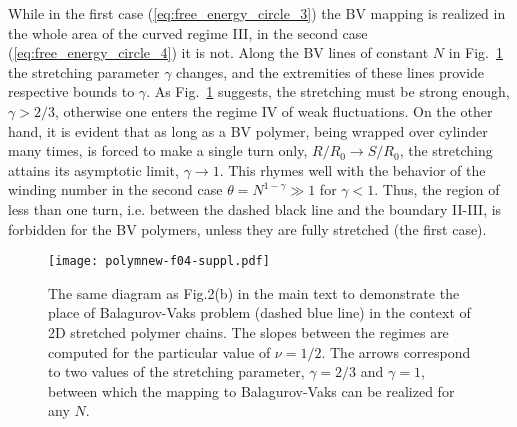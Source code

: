 \documentclass[aps,pre,floatfix,twocolumn,nofootinbib]{revtex4-2}
\newcommand{\eq}[1]{(\ref{#1})}
\newcommand{\fig}[1]{Fig.~\ref{#1}}
\begin{document}
While in the first case \eq{eq:free_energy_circle_3} the BV mapping is realized in the whole area of the curved regime III, in the second case \eq{eq:free_energy_circle_4} it is not. Along the BV lines of constant $N$ in \fig{fig:diagram_bv} the stretching parameter $\gamma$ changes, and the extremities of these lines provide respective bounds to $\gamma$. As \fig{fig:diagram_bv} suggests, the stretching must be strong enough, $\gamma > 2/3$, otherwise one enters the regime IV of weak fluctuations. On the other hand, it is evident that as long as a BV polymer, being wrapped over cylinder many times, is forced to make a single turn only, $R/R_0 \to S/R_0$, the stretching attains its asymptotic limit, $\gamma \to 1$. This rhymes well with the behavior of the winding number in the second case $\theta = N^{1-\gamma} \gg 1$ for $\gamma<1$. Thus, the region of less than one turn, i.e. between the dashed black line and the boundary II-III, is forbidden for the BV polymers, unless they are fully stretched (the first case).


\begin{figure}[ht]
  \centering
  \texttt{[image: polymnew-f04-suppl.pdf]}
  \caption{The same diagram as Fig.2(b) in the main text to demonstrate the place of Balagurov-Vaks problem (dashed blue line) in the context of 2D stretched polymer chains. The slopes between the regimes are computed for the particular value of $\nu=1/2$. The arrows correspond to two values of the stretching parameter, $\gamma=2/3$ and $\gamma=1$, between which the mapping to Balagurov-Vaks can be realized for any $N$.}
  \label{fig:diagram_bv}
\end{figure}
\end{document}
